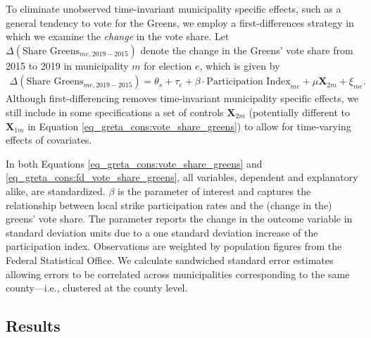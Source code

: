 To eliminate unobserved time-invariant municipality specific effects, such as a general tendency to vote for the Greens, we employ a first-differences strategy in which we examine the \textit{change} in the vote share. Let $\Delta(\text{Share Greens}_{me,2019-2015})$ denote the change in the Greens' vote share from 2015 to 2019 in municipality $m$ for election $e$, which is given by
\begin{align}
	\Delta(\text{Share Greens}_{me,2019-2015}) = \theta_s + \tau_e + \beta\cdot\text{Participation Index}_{me} + \mu \mathbf{X}_{2m} + \xi_{me}.\label{eq_greta_cons:fd_vote_share_greens}
\end{align}
Although first-differencing removes time-invariant municipality specific effects, we still include in some specifications a set of controls $\mathbf{X}_{2m}$ (potentially different to $\mathbf{X}_{1m}$ in Equation \ref{eq_greta_cons:vote_share_greens}) to allow for time-varying effects of covariates.


In both Equations \ref{eq_greta_cons:vote_share_greens} and \ref{eq_greta_cons:fd_vote_share_greens}, all variables, dependent and explanatory alike, are standardized. $\beta$ is the parameter of interest and captures the relationship between local strike participation rates and the (change in the) greens' vote share. The parameter reports the change in the outcome variable in standard deviation units due to a one standard deviation increase of the participation index. Observations are weighted by population figures from the Federal Statistical Office. We calculate sandwiched standard error estimates allowing errors to be correlated across municipalities corresponding to the same county---i.e., clustered at the county level.





\subsection{Results}

